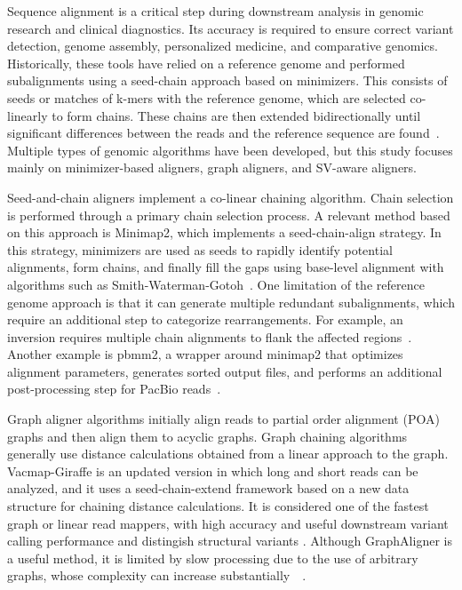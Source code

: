 \documentclass[12pt, letterpaper]{article}
\begin{document}
Sequence alignment is a critical step during downstream analysis in genomic research and clinical diagnostics. Its accuracy is required to ensure correct variant detection, genome assembly, personalized medicine, and comparative genomics. Historically, these tools have relied on a reference genome and performed subalignments using a seed-chain approach based on minimizers. This consists of seeds or matches of k-mers with the reference genome, which are selected co-linearly to form chains. These chains are then extended bidirectionally until significant differences between the reads and the reference sequence are found~\cite{vacmap2025}. Multiple types of genomic algorithms have been developed, but this study focuses mainly on minimizer-based aligners, graph aligners, and SV-aware aligners.

Seed-and-chain aligners implement a co-linear chaining algorithm. Chain selection is performed through a primary chain selection process. A relevant method based on this approach is Minimap2, which implements a seed-chain-align strategy. In this strategy, minimizers are used as seeds to rapidly identify potential alignments, form chains, and finally fill the gaps using base-level alignment with algorithms such as Smith-Waterman-Gotoh~\cite{Liyanage2024}. One limitation of the reference genome approach is that it can generate multiple redundant subalignments, which require an additional step to categorize rearrangements. For example, an inversion requires multiple chain alignments to flank the affected regions~\cite{vacmap2025}. Another example is pbmm2, a wrapper around minimap2 that optimizes alignment parameters, generates sorted output files, and performs an additional post-processing step for PacBio reads~\cite{Wang2026}.

Graph aligner algorithms initially align reads to partial order alignment (POA) graphs and then align them to acyclic graphs. Graph chaining algorithms generally use distance calculations obtained from a linear approach to the graph. Vacmap-Giraffe is an updated version in which long and short reads can be analyzed, and it uses a seed-chain-extend framework based on a new data structure for chaining distance calculations. It is considered one of the fastest graph or linear read mappers, with high accuracy and useful downstream variant calling performance and distingish structural variants . Although GraphAligner is a useful method, it is limited by slow processing due to the use of arbitrary graphs, whose complexity can increase substantially~\cite{Chang2025}~\cite{Sirén2025}.
\end{document}
